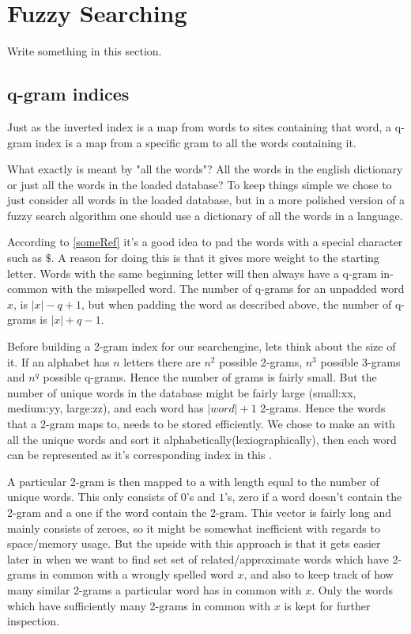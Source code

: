 \section{Fuzzy Searching}
Write something in this section.


\subsection{q-gram indices}
Just as the inverted index is a map from words to sites containing that word, a q-gram index is a map from a specific gram to all the words containing it. 

What exactly is meant by "all the words"? All the words in the english dictionary or just all the words in the loaded database? To keep things simple we chose to just consider all words in the loaded database, but in a more polished version of a fuzzy search algorithm one should use a dictionary of all the words in a language. 


According to \ref{someRef} it's a good idea to pad the words with a special character such as \(\$\). A reason for doing this is that it gives more weight to the starting letter. Words with the same beginning letter will then always have a q-gram in-common with the misspelled word. 
The number of q-grams for an unpadded word \(x\), is \(|x| - q + 1\), but when padding the word as described above, the number of q-grams is \(|x| + q - 1\).  

Before building a 2-gram index for our searchengine, lets think about the size of it.
If an alphabet has \(n\) letters there are \(n^2\) possible 2-grams, \(n^3\) possible 3-grams and \(n^q\) possible q-grams. Hence the number of grams is fairly small. But the number of unique words in the database might be fairly large (small:xx, medium:yy, large:zz), and each word has \(|word| + 1\) 2-grams. Hence the words that a 2-gram maps to, needs to be stored efficiently. 
We chose to make an  with all the unique words and sort it alphabetically(lexiographically), then each word can be represented as it's corresponding index in this .

A particular 2-gram is then mapped to a  with length equal to the number of unique words. This  only consists of \(0\)'s and \(1\)'s, zero if a word doesn't contain the 2-gram and a one if the word contain the 2-gram.
This vector is fairly long and mainly consists of zeroes, so it might be somewhat inefficient with regards to space/memory usage. 
But the upside with this approach is that it gets easier later in  when we want to find set set of related/approximate words which have 2-grams in common with a wrongly spelled word \(x\), and also to keep track of how many similar 2-grams a particular word has in common with \(x\). Only the words which have sufficiently many 2-grams in common with \(x\) is kept for further inspection. 

